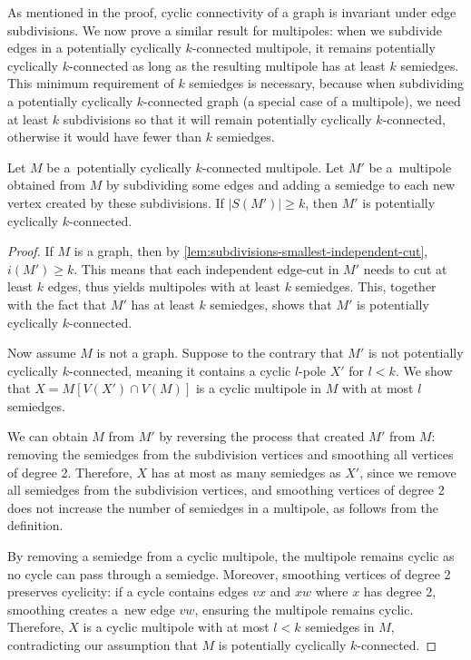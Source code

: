\documentclass[12pt, twoside]{book}
\begin{document}
As mentioned in the proof, cyclic connectivity of a graph is invariant under edge subdivisions. We now prove a similar result for multipoles: when we subdivide edges in a potentially cyclically \mbox{$k$-connected} multipole, it remains potentially cyclically \mbox{$k$-connected} as long as the resulting multipole has at least $k$ semiedges. This minimum requirement of $k$ semiedges is necessary, because when subdividing a potentially cyclically $k$-connected graph (a special case of a multipole), we need at least $k$ subdivisions so that it will remain potentially cyclically $k$-connected, otherwise it would have fewer than $k$ semiedges.

\begin{theorem}\label{th:subdivisions-potentially-cyclically-connected}
	Let $M$ be a~potentially cyclically $k$-connected multipole. Let $M'$ be a~multipole obtained from $M$ by subdividing some edges and adding a semiedge to each new vertex created by these subdivisions. If $|S(M')|\geq k$, then $M'$ is potentially cyclically $k$-connected.
\end{theorem}

\begin{proof}
	If $M$ is a graph, then by \cref{lem:subdivisions-smallest-independent-cut}, $i(M')\geq k$. This means that each independent edge-cut in $M'$ needs to cut at least $k$ edges, thus yields multipoles with at least $k$ semiedges. This, together with the fact that $M'$ has at least $k$ semiedges, shows that $M'$ is potentially cyclically $k$-connected.
	
	Now assume $M$ is not a graph. Suppose to the contrary that $M'$ is not potentially cyclically $k$-connected, meaning it contains a cyclic $l$-pole $X'$ for $l<k$. We show that $X=M[V(X')\cap V(M)]$ is a cyclic multipole in $M$ with at most $l$ semiedges.
	
	We can obtain $M$ from $M'$ by reversing the process that created $M'$ from $M$: removing the semiedges from the subdivision vertices and smoothing all vertices of degree 2. Therefore, $X$ has at most as many semiedges as $X'$, since we remove all semiedges from the subdivision vertices, and smoothing vertices of degree 2 does not increase the number of semiedges in a multipole, as follows from the definition.
	
	By removing a semiedge from a cyclic multipole, the multipole remains cyclic as no cycle can pass through a semiedge. Moreover, smoothing vertices of degree 2 preserves cyclicity: if a cycle contains edges $vx$ and $xw$ where $x$ has degree 2, smoothing creates a~new edge $vw$, ensuring the multipole remains cyclic. Therefore, $X$ is a cyclic multipole with at most $l<k$ semiedges in $M$, contradicting our assumption that $M$ is potentially cyclically $k$-connected.
\end{proof}
\end{document}
